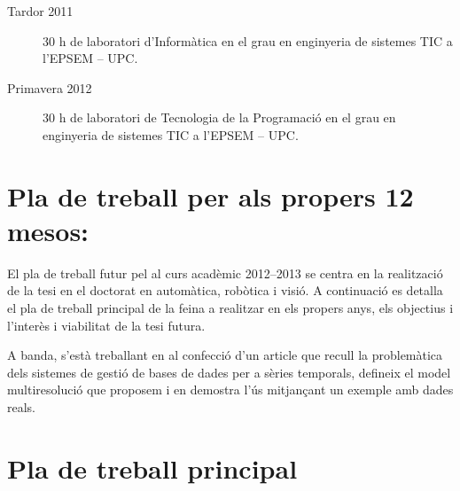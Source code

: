 \begin{description}

\item[Tardor 2011] 30 h de laboratori d'Informàtica en el grau en
  enginyeria de sistemes TIC a l'EPSEM -- UPC.

\item[Primavera 2012] 30 h de laboratori de Tecnologia de la
  Programació en el grau en enginyeria de sistemes TIC a l'EPSEM --
  UPC.

\end{description}



\newpage

\section*{Pla de treball per als propers 12 mesos:}

El pla de treball futur pel al curs acadèmic 2012--2013 se centra en
la realització de la tesi en el doctorat en automàtica, robòtica i
visió. 
A continuació es detalla el pla de treball principal de la feina a
realitzar en els propers anys, els objectius i l'interès i viabilitat
de la tesi futura.

A banda, s'està treballant en al confecció d'un article que recull la problemàtica dels sistemes de gestió de bases de dades per a sèries temporals, defineix el model multiresolució que proposem i en demostra l'ús mitjançant un exemple amb dades reals. 





\section*{Pla de treball principal}










